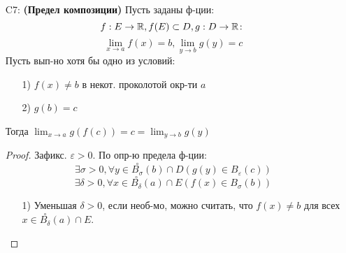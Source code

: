 \begin{itemize}
    \[
      \exists \delta > 0, \exists C > 0, \forall x \in \overset{\circ}{B_{\delta}}(a) \cap E ( \left|f(x)\right| \leq C)
    \]
    \begin{proof}
    Пусть $\lim_{x\to a} f(x) = b$. Тода
    \[
      \exists \delta > 0, \forall x \in \overset{\circ}{B_{\delta}}(a) \cap E ( b - 1 < f(x) < b + 1) (\varepsilon = 1)
    \]
   Положим тогда $C = \left|b\right| + 1$.
    \end{proof}
  \item [C7: ] \textbf{(Предел композиции)} Пусть заданы ф-ции:
    \[
    f: E \rightarrow \mathbb{R}, f(E) \subset D, g: D \rightarrow \mathbb{R} \colon 
    \]
    \[
    \lim_{x\to a} f(x) = b, \lim_{y\to b} g(y) = c
    \]
    Пусть вып-но хотя бы одно из условий:
    \begin{itemize}
      \item [1) ] $f(x) \neq b$ в некот. проколотой окр-ти $a$
      \item [2) ] $g(b) = c$
    \end{itemize}
    Тогда $\lim_{x\to a} g(f(c)) = c = \lim_{y\to b} g(y)$
    \begin{proof}
    Зафикс. $\varepsilon > 0$. По опр-ю предела ф-ции:
    \[
    \exists \sigma > 0, \forall y \in \overset{\circ}{B_{\sigma}}(b) \cap D ( g(y) \in B_{\varepsilon}(c))
    \]
    \[
    \exists \delta > 0, \forall x \in \overset{\circ}{B_{\delta}}(a) \cap E (f(x) \in B_{\sigma}(b))
    \]
    \begin{itemize}
      \item [1) ] Уменьшая $\delta > 0$, если необ-мо, можно считать, что $f(x) \neq b$ для всех $x \in \overset{\circ}{B_{\delta}}(a) \cap E$. \\


\end{itemize}
\end{proof}
\end{itemize}
